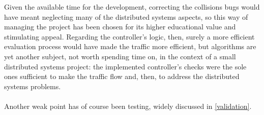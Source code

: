 Given the available time for the development, correcting the collisions bugs
would have meant neglecting many of the distributed systems aspects, so this way
of managing the project has been chosen for its higher educational value and
stimulating appeal. Regarding the controller's logic, then, surely a more
efficient evaluation process would have made the traffic more efficient, but
algorithms are yet another subject, not worth spending time on, in the context
of a small distributed systems project: the implemented controller's checks
were the sole ones sufficient to make the traffic flow and, then, to address
the distributed systems problems.
\\
\\
Another weak point has of course been testing, widely discussed in
\ref{validation}.
